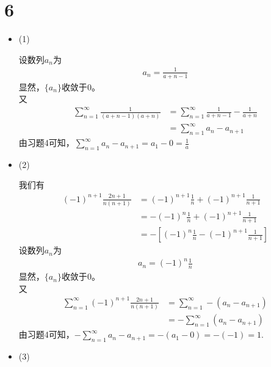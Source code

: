 \documentclass{article}
\begin{document}
\section*{6}

\begin{itemize}
  \item (1)

        设数列${a_n}$为
        \begin{align*}
          a_n = \frac{1}{a + n - 1}
        \end{align*}
        显然，$\{a_n\}$收敛于$0$。\\
        又
        \begin{align*}
          \sum \limits_{n = 1}^\infty \frac{1}{(a + n - 1)(a + n)}
           & =  \sum \limits_{n = 1}^\infty \frac{1}{a + n - 1} - \frac{1}{a + n} \\
           & =  \sum \limits_{n = 1}^\infty a_n - a_{n + 1}
        \end{align*}
        由习题4可知，$\sum \limits_{n = 1}^\infty a_n - a_{n + 1} = a_1 - 0 = \frac{1}{a}$

  \item (2)

        我们有
        \begin{align*}
          (-1)^{n + 1}\frac{2n + 1}{n(n + 1)} & = (-1)^{n + 1}\frac{1}{n} + (-1)^{n + 1}\frac{1}{n + 1}           \\
                                              & = -(-1)^n \frac{1}{n} + (-1)^{n + 1}\frac{1}{n + 1}               \\
                                              & = - \left[(-1)^n \frac{1}{n} - (-1)^{n + 1}\frac{1}{n + 1}\right]
        \end{align*}
        设数列${a_n}$为
        \begin{align*}
          a_n = (-1)^n \frac{1}{n}
        \end{align*}
        显然，$\{a_n\}$收敛于$0$。\\
        又
        \begin{align*}
          \sum \limits_{n = 1}^\infty (-1)^{n + 1}\frac{2n + 1}{n(n + 1)}
           & =  \sum \limits_{n = 1}^\infty - (a_n - a_{n + 1}) \\
           & = - \sum \limits_{n = 1}^\infty (a_n - a_{n + 1})
        \end{align*}
        由习题4可知，$- \sum \limits_{n = 1}^\infty a_n - a_{n + 1} = -(a_1 - 0) = -(-1) = 1$.

  \item (3)


\end{itemize}
\end{document}
